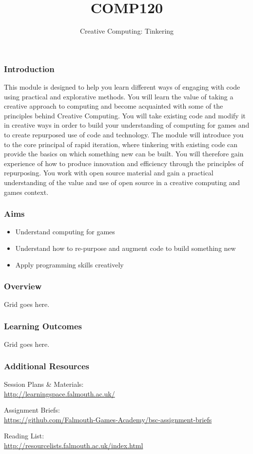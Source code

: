 \documentclass[handout, xcolor={dvipsnames}]{beamer}\usepackage{etoolbox}\newtoggle{printable}\toggletrue{printable}
\begin{document}
\title{COMP120}
\subtitle{Creative Computing: Tinkering }

\frame{\titlepage} 

\begin{frame}
	\frametitle{Introduction}
This module is designed to help you learn different ways of engaging with code using practical and explorative methods. You will learn the value of taking a creative approach to computing and become acquainted with some of the principles behind Creative Computing. You will take existing code and modify it in creative ways in order to build your understanding of computing for games and to create repurposed use of code and technology. The module will introduce you to the core principal of rapid iteration, where tinkering with existing code can provide the basics on which something new can be built. You will therefore gain experience of how to produce innovation and efficiency through the principles of repurposing. You work with open source material and gain a practical understanding of the value and use of open source in a creative computing and games context. 
	
\end{frame}

\begin{frame}
	\frametitle{Aims}
	\begin{itemize}
		\item Understand computing for games
		\item Understand how to re-purpose and augment code to build something new
		\item Apply programming skills creatively
	\end{itemize}
\end{frame}

\begin{frame}
	\frametitle{Overview}
	
	Grid goes here.
\end{frame}

\begin{frame}
	\frametitle{Learning Outcomes}
	
	Grid goes here.
\end{frame}

\begin{frame}
\frametitle{Additional Resources}

Session Plans \& Materials: \\
\url{http://learningspace.falmouth.ac.uk/}

\vspace{1.5em}	

Assignment Briefs: \\
\url{https://github.com/Falmouth-Games-Academy/bsc-assignment-briefs}

\vspace{1.5em}	

Reading List: \\
\url{http://resourcelists.falmouth.ac.uk/index.html}

\end{frame}
\end{document}
